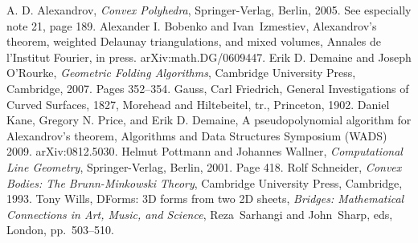 \documentclass{article}
\begin{document}
\begin{thebibliography}{PW01}
A. D. Alexandrov,  {\sl Convex Polyhedra},
  Springer-Verlag, Berlin, 2005.  See especially note 21, page 189.
Alexander I. Bobenko and Ivan~Izmestiev, Alexandrov's
  theorem, weighted Delaunay triangulations, and mixed volumes,
  Annales de l'Institut Fourier, in press. {\rm arXiv:math.DG/0609447}.
Erik D. Demaine and Joseph O'Rourke, {\sl
    Geometric Folding Algorithms}, Cambridge University Press,
  Cambridge, 2007.  Pages 352--354.
Gauss, Carl Friedrich, General Investigations of
  Curved Surfaces, 1827, Morehead and Hiltebeitel, tr., Princeton, 1902.
Daniel Kane, Gregory N. Price, and Erik
  D. Demaine, A pseudopolynomial algorithm for Alexandrov's theorem,
  Algorithms and Data Structures Symposium (WADS) 2009.  {\rm arXiv:0812.5030}.
Helmut Pottmann and Johannes Wallner, {\sl
    Computational Line Geometry}, Springer-Verlag, Berlin, 2001.  Page
  418.
Rolf Schneider, {\sl Convex Bodies: The
    Brunn-Minkowski Theory}, Cambridge University Press, Cambridge,
  1993.
Tony Wills, DForms: 3D forms from two 2D sheets,
  {\sl Bridges: Mathematical Connections in Art, Music, and Science},
  Reza~Sarhangi and John~Sharp, eds, London, pp.~503--510.
\end{thebibliography}
\end{document}
